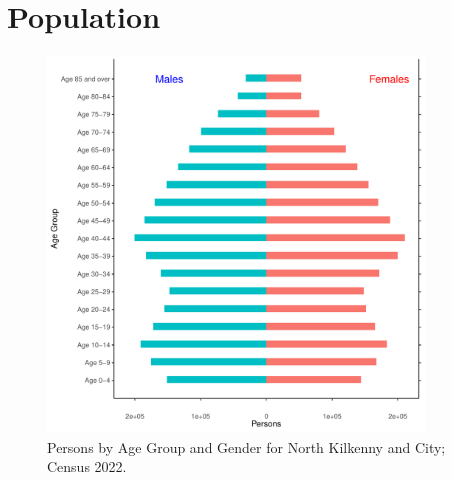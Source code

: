 \documentclass{article}
\begin{document}
\pagebreak

\section{Population} 
\label{sect:Pop}

\begin{figure}[h]
	\centering
	\includegraphics[width = 100mm]{../figures/PyramidPlot.pdf}
	\caption{Persons by Age Group and Gender for North Kilkenny and City; Census 2022.}
	\label{fig:2ae19629-1a6a-13a3-e055-000000000001}
	\end{figure}
\end{document}
